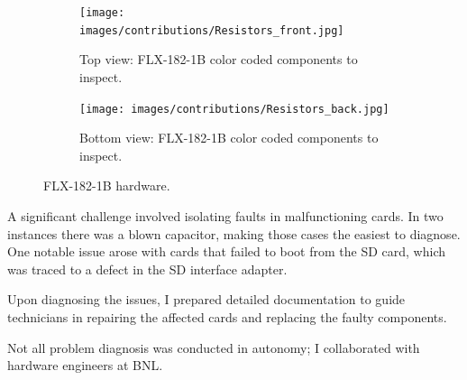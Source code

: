 \begin{figure}[H]
\centering
\begin{subfigure}[b]{\textwidth}
    \centering
    \texttt{[image: images/contributions/Resistors\_front.jpg]}
    \caption{Top view: FLX-182-1B color coded components to inspect.}
    \label{fig:FLX-182-top-resistors}
\end{subfigure}

\vspace{0.2cm}

\begin{subfigure}[b]{\textwidth}
    \centering
    \texttt{[image: images/contributions/Resistors\_back.jpg]}
    \caption{Bottom view: FLX-182-1B color coded components to inspect.}
    \label{fig:FLX-182-bot-resistors}
\end{subfigure}
\caption{FLX-182-1B hardware.}
\label{fig:FLX-182-hardware-inspection}
\end{figure}

A significant challenge involved isolating faults in malfunctioning cards. In two instances there was a blown capacitor, making those cases the easiest to diagnose. One notable issue arose with cards that failed to boot from the SD card, which was traced to a defect in the SD interface adapter.

Upon diagnosing the issues, I prepared detailed documentation to guide technicians in repairing the affected cards and replacing the faulty components.

Not all problem diagnosis was conducted in autonomy; I collaborated with hardware engineers at \acf{BNL}.

